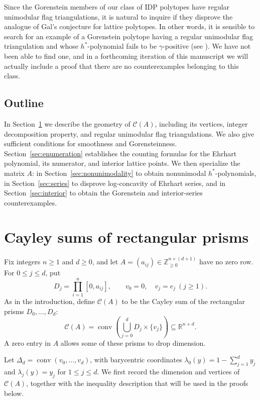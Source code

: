 \documentclass[11pt, letterpaper, english]{amsart}
\theoremstyle{teoremas}
\theoremstyle{definition}
\newcommand{\R}{\mathbb{R}}
\newcommand{\Z}{\mathbb{Z}}
\DeclareMathOperator*{\conv}{conv}
\newcommand{\cC}{\mathcal C}
\begin{document}
Since the Gorenstein members of our class of IDP polytopes have regular unimodular flag triangulations, it is natural to inquire if they disprove the analogue of Gal's conjecture for lattice polytopes. In other words, it is sensible to search for an example of a Gorenstein polytope having a regular unimodular flag triangulation and whose $h^*$-polynomial fails to be $\gamma$-positive (see \cite[Conjecture~3.28]{ferroni-higashitani}). We have not been able to find one, and in a forthcoming iteration of this manuscript we will actually include a proof that there are no counterexamples belonging to this class.

\subsection*{Outline}
In Section~\ref{sec:prisms} we describe the geometry of $\mathcal C(A)$,
including its vertices, integer decomposition property, and regular
unimodular flag triangulations. We also give sufficient conditions for
smoothness and Gorensteinness. Section~\ref{sec:enumeration} establishes
the counting formulas for the Ehrhart polynomial, its numerator, and
interior lattice points. We then specialize the matrix $A$: in
Section~\ref{sec:nonunimodality} to obtain nonunimodal $h^*$-polynomials,
in Section~\ref{sec:series} to disprove log-concavity of Ehrhart series,
and in Section~\ref{sec:interior} to obtain the Gorenstein and interior-series
counterexamples.


\section{Cayley sums of rectangular prisms}\label{sec:prisms}

Fix integers $n\ge1$ and $d\ge0$, and let
$A=(a_{ij})\in\Z_{\ge0}^{n\times(d+1)}$ have no zero row.
For $0\le j\le d$, put
\[
 D_j=\prod_{i=1}^n[0,a_{ij}],\qquad
 v_0=0,\quad v_j=e_j\ (j\ge1).
\]
As in the introduction, define $\cC(A)$ to be the Cayley sum of the
rectangular prisms $D_0,\ldots,D_d$:
\[
 \cC(A)=\conv\left(\bigcup_{j=0}^d D_j\times\{v_j\}\right)
 \subseteq\R^{n+d}.
\]
A zero entry in $A$ allows some of these prisms to drop dimension.

Let $\Delta_d=\conv(v_0,\ldots,v_d)$, with barycentric coordinates
$\lambda_0(y)=1-\sum_{j=1}^d y_j$ and $\lambda_j(y)=y_j$ for
$1\le j\le d$. We first record the dimension and vertices of
$\cC(A)$, together with the inequality description that will be used
in the proofs below.
\end{document}
